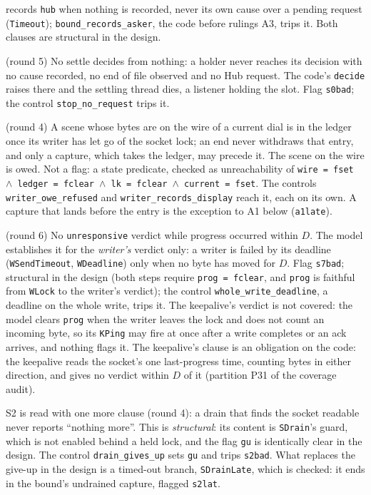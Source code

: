 \documentclass[a4paper,10pt,fleqn]{article}
\begin{document}
\begin{description}
    records \texttt{hub} when nothing is recorded, never its own cause over a
    pending request (\texttt{Timeout}); \texttt{bound\_records\_asker}, the code
    before rulings A3, trips it.  Both clauses are structural in the design.
  \item[S0] (round 5) No settle decides from nothing: a holder never reaches its
    decision with no cause recorded, no end of file observed and no Hub request.
    The code's \texttt{decide} raises there and the settling thread dies, a
    listener holding the slot.  Flag \texttt{s0bad}; the control
    \texttt{stop\_no\_request} trips it.
  \item[S6] (round 4) A scene whose bytes are on the wire of a current dial is in
    the ledger once its writer has let go of the socket lock; an end never
    withdraws that entry, and only a capture, which takes the ledger, may precede
    it.  The scene on the wire is owed.  Not a flag: a state predicate, checked as
    unreachability of \texttt{wire = fset $\land$ ledger = fclear $\land$
    lk = fclear $\land$ current = fset}.  The controls
    \texttt{writer\_owe\_refused} and \texttt{writer\_records\_display} reach it,
    each on its own.  A capture that lands before the entry is the exception to
    A1 below (\texttt{a1late}).
  \item[S7] (round 6) No \texttt{unresponsive} verdict while progress occurred
    within $D$.  The model establishes it for the \emph{writer's} verdict only:
    a writer is failed by its deadline (\texttt{WSendTimeout},
    \texttt{WDeadline}) only when no byte has moved for $D$.  Flag
    \texttt{s7bad}; structural in the design (both steps require
    \texttt{prog = fclear}, and \texttt{prog} is faithful from \texttt{WLock} to
    the writer's verdict); the control \texttt{whole\_write\_deadline}, a
    deadline on the whole write, trips it.  The keepalive's verdict is not
    covered: the model clears \texttt{prog} when the writer leaves the lock and
    does not count an incoming byte, so its \texttt{KPing} may fire at once
    after a write completes or an ack arrives, and nothing flags it.  The
    keepalive's clause is an obligation on the code: the keepalive reads the
    socket's one last-progress time, counting bytes in either direction, and
    gives no verdict within $D$ of it (partition P31 of the coverage audit).
\end{description}

S2 is read with one more clause (round 4): a drain that finds the socket
readable never reports ``nothing more''.  This is \emph{structural}: its content
is \texttt{SDrain}'s guard, which is not enabled behind a held lock, and the flag
\texttt{gu} is identically clear in the design.  The control
\texttt{drain\_gives\_up} sets \texttt{gu} and trips \texttt{s2bad}.  What
replaces the give-up in the design is a timed-out branch, \texttt{SDrainLate},
which is checked: it ends in the bound's undrained capture, flagged
\texttt{s2lat}.
\end{document}
